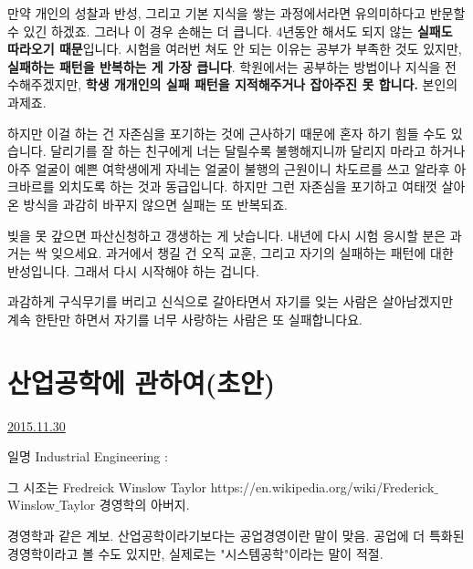 만약 개인의 성찰과 반성, 그리고 기본 지식을 쌓는 과정에서라면 유의미하다고 반문할 수 있긴 하겠죠.
그러나 이 경우 손해는 더 큽니다. 4년동안 해서도 되지 않는 \textbf{실패도 따라오기 때문}입니다.
시험을 여러번 쳐도 안 되는 이유는 공부가 부족한 것도 있지만, \textbf{실패하는 패턴을 반복하는 게 가장 큽니다}.
학원에서는 공부하는 방법이나 지식을 전수해주겠지만, \textbf{학생 개개인의 실패 패턴을 지적해주거나 잡아주진 못 합니다.}
본인의 과제죠.
\vspace{5mm}

하지만 이걸 하는 건 자존심을 포기하는 것에 근사하기 때문에 혼자 하기 힘들 수도 있습니다.
달리기를 잘 하는 친구에게 너는 달릴수록 불행해지니까 달리지 마라고 하거나
아주 얼굴이 예쁜 여학생에게 자네는 얼굴이 불행의 근원이니 차도르를 쓰고 알라후 아크바르를 외치도록 하는 것과 동급입니다.
하지만 그런 자존심을 포기하고 여태껏 살아온 방식을 과감히 바꾸지 않으면 실패는 또 반복되죠.
\vspace{5mm}

빚을 못 갚으면 파산신청하고 갱생하는 게 낫습니다.
내년에 다시 시험 응시할 분은 과거는 싹 잊으세요. 과거에서 챙길 건 오직 교훈, 그리고 자기의 실패하는 패턴에 대한 반성입니다.
그래서 다시 시작해야 하는 겁니다.
\vspace{5mm}

과감하게 구식무기를 버리고 신식으로 갈아타면서 자기를 잊는 사람은 살아남겠지만
계속 한탄만 하면서 자기를 너무 사랑하는 사람은 또 실패합니다요.
\vspace{5mm}








\section{산업공학에 관하여(초안)}
\href{https://www.kockoc.com/Apoc/519751}{2015.11.30}

\vspace{5mm}

일명 Industrial Engineering :
\vspace{5mm}

그 시조는 Fredreick Winslow Taylor
https://en.wikipedia.org/wiki/Frederick$\_$Winslow$\_$Taylor
경영학의 아버지.
\vspace{5mm}

경영학과 같은 계보. 산업공학이라기보다는 공업경영이란 말이 맞음.
공업에 더 특화된 경영학이라고 볼 수도 있지만, 실제로는 "시스템공학"이라는 말이 적절.
\vspace{5mm}

